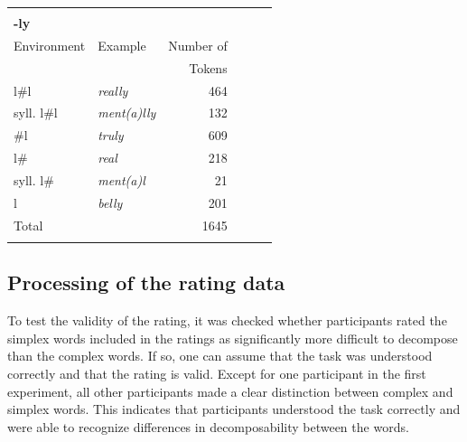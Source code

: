 \begin{table}[]
\begin{center}
{\begin{tabular} {llrllr}
			& & & \\
			\textbf{-ly}&&& & & \\
			\hline	%
			Environment & Example & Number of & & & \\
						 &  & Tokens & & & \\
			\hline
			l\#l &\color[HTML]{3166FF}\textit{really} & 464 & & & \\ 
			syll. l\#l &\color[HTML]{3166FF}\textit{ment(a)lly} & 132 & & & \\ 
			\#l &\color[HTML]{3166FF}\textit{truly} & 609& & & \\ 
			l\# &\color[HTML]{3166FF}\textit{real} & 218& & & \\ 
			syll. l\#&\color[HTML]{3166FF}\textit{ment(a)l} &21& & &\\ 
			l &\color[HTML]{3166FF}\textit{belly} & 201& & & \\ 
			\hline   	
			Total&  &1645 & & & \\ 

			\hline& & & 
		\end{tabular}
	}
	\end{center}
\end{table}



\subsection{Processing of the rating data} \label{Processing of the Rating Data}


To test the validity of the rating, it was checked whether participants rated the simplex words included in the ratings as significantly more difficult to decompose than the complex words. If so, one can assume that the task was understood correctly and that the rating is valid. 
Except for one participant in the first experiment, all other participants made a clear distinction between complex and simplex words. This indicates that participants understood the task correctly and were able to recognize differences in decomposability between the words.

